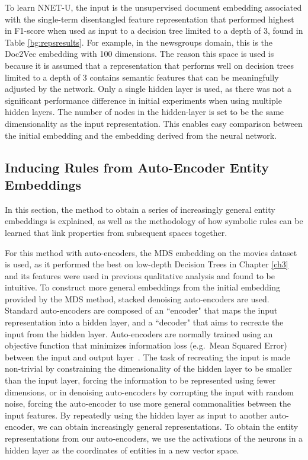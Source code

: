 To learn NNET-U, the input is the unsupervised document embedding associated with the single-term disentangled feature representation that performed highest in F1-score when used as input to a  decision tree limited to a depth of 3,  found in Table \ref{bg:repsresults}. For example, in the newsgroups domain, this is the Doc2Vec embedding with 100 dimensions. The reason this space is used is because it is assumed that a representation that performs well on  decision trees limited to a depth of 3 contains semantic features that can be meaningfully adjusted by the network. Only a single hidden layer is used, as there was not a significant performance difference in initial experiments when using multiple hidden layers. The number of nodes in the hidden-layer is set to be the same dimensionality as the input representation. This enables easy comparison between the initial  embedding and the embedding derived from the neural network.







\subsection{Inducing Rules from Auto-Encoder Entity Embeddings}\label{InducingRulesFromEntityEmbeddings}

In this section, the method to obtain a series of increasingly general entity embeddings is explained, as well as the methodology of how symbolic rules can be learned that link properties from subsequent spaces together. 

For this method with auto-encoders, the MDS embedding on the movies dataset is used, as it performed the best on low-depth Decision Trees in Chapter \ref{ch3} and its features were used in previous qualitative analysis and found to be intuitive. To construct more general embeddings from the initial embedding provided by the MDS method, stacked denoising auto-encoders \cite{Vincent2008a} are used. Standard auto-encoders are composed of an ``encoder" that maps the input representation into a hidden layer, and a ``decoder" that aims to recreate the input from the hidden layer. Auto-encoders are normally trained using an objective function that minimizes information loss (e.g.\ Mean Squared Error) between the input and output layer~\cite{Bengio2009}. The task of recreating the input is made non-trivial by constraining the dimensionality of the hidden layer to be smaller than the input layer, forcing the information to be represented using fewer dimensions, or in denoising auto-encoders by corrupting the input with random noise, forcing the auto-encoder to use more general commonalities between the input features. By repeatedly  using the hidden layer as input to another auto-encoder, we can obtain increasingly general representations. To obtain the entity representations from our auto-encoders, we use the activations of the neurons in a hidden layer as the coordinates of entities in a new vector space. 

